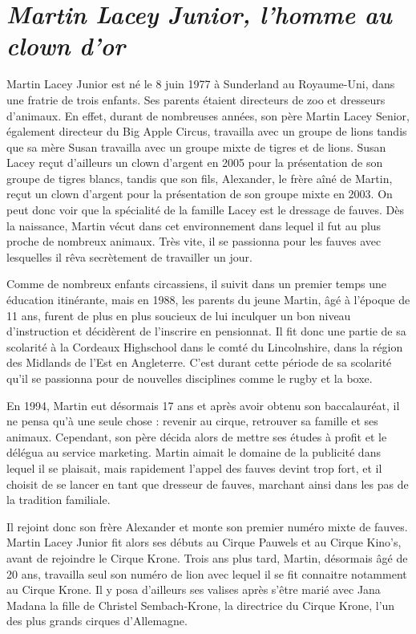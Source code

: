 \section*{\textit{Martin Lacey Junior, l'homme au clown d'or}}
{}
\noindent
Martin Lacey Junior est né le 8 juin 1977 à Sunderland au Royaume-Uni, dans une fratrie de trois enfants. Ses parents étaient directeurs de zoo et dresseurs d’animaux. En effet, durant de nombreuses années, son père Martin Lacey Senior, également directeur du Big Apple Circus, travailla avec un groupe de lions tandis que sa mère Susan travailla avec un groupe mixte de tigres et de lions. Susan Lacey reçut d'ailleurs un clown d'argent en 2005 pour la présentation de son groupe de tigres blancs, tandis que son fils, Alexander, le frère aîné de Martin, reçut un clown d'argent pour la présentation de son groupe mixte en 2003. On peut donc voir que la spécialité de la famille Lacey est le dressage de fauves. Dès la naissance, Martin vécut dans cet environnement dans lequel il fut au plus proche de nombreux animaux. Très vite, il se passionna pour les fauves avec lesquelles il rêva secrètement de travailler un jour.

Comme de nombreux enfants circassiens, il suivit dans un premier temps une éducation itinérante, mais en 1988, les parents du jeune Martin, âgé à l’époque de 11 ans, furent de plus en plus soucieux de lui inculquer un bon niveau d'instruction et décidèrent de l'inscrire en pensionnat. Il fit donc une partie de sa scolarité à la Cordeaux Highschool dans le comté du Lincolnshire, dans la région des Midlands de l'Est en Angleterre. C'est durant cette période de sa scolarité qu'il se passionna pour de nouvelles disciplines comme le rugby et la boxe.

En 1994, Martin eut désormais 17 ans et après avoir obtenu son baccalauréat, il ne pensa qu'à une seule chose : revenir au cirque, retrouver sa famille et ses animaux. Cependant, son père décida alors de mettre ses études à profit et le délégua au service marketing. Martin aimait le domaine de la publicité dans lequel il se plaisait, mais rapidement l'appel des fauves devint trop fort, et il choisit de se lancer en tant que dresseur de fauves, marchant ainsi dans les pas de la tradition familiale.

Il rejoint donc son frère Alexander et monte son premier numéro mixte de fauves. Martin Lacey Junior fit alors ses débuts au Cirque Pauwels et au Cirque Kino's, avant de rejoindre le Cirque Krone. Trois ans plus tard, Martin, désormais âgé de 20 ans, travailla seul son numéro de lion avec lequel il se fit connaitre notamment au Cirque Krone. Il y posa d’ailleurs ses valises après s'être marié avec Jana Madana la fille de Christel Sembach-Krone, la directrice du Cirque Krone, l'un des plus grands cirques d'Allemagne.

